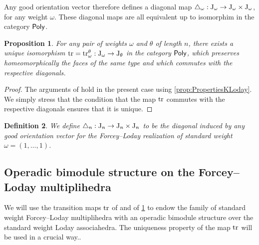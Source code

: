 \documentclass[twoside, 12pt]{amsart}
\newtheorem{definition}{Definition}[section]
\newtheorem{proposition}[definition]{Proposition}
\theoremstyle{remark}
\begin{document}
Any good orientation vector therefore defines a diagonal map $\triangle_\omega : \mathrm{J}_\omega\to \mathrm{J}_\omega \times \mathrm{J}_\omega$, for any weight $\omega$.
These diagonal maps are all equivalent up to isomorphim in the category $\mathsf{Poly}$. 

\begin{proposition}
\label{prop:transitionmap}
For any pair of weights $\omega$ and $\theta$ of length $n$, there exists a unique isomorphism 
$\mathrm{tr}=\mathrm{tr}_\omega^\theta : \mathrm{J}_\omega \to \mathrm{J}_\theta$ in the category $\mathsf{Poly}$,  
which preserves homeomorphically the faces of the same type and which commutes with the respective diagonals.
\end{proposition}

\begin{proof}
The arguments of \cite[Sections~3.1-3.2]{MTTV19} hold in the present case using \cref{prop:PropertiesKLoday}. 
We simply stress that the condition that the map $\mathrm{tr}$ commutes with the respective diagonals ensures that it is unique.
\end{proof}

\begin{definition} \label{def:diagonal-multipl-forcey-loday}
We define $\triangle_n : \mathrm{J}_n \to \mathrm{J}_n\times \mathrm{J}_n$ to be the diagonal induced by any good orientation vector for the Forcey--Loday realization of standard weight $\omega=(1, \ldots, 1)$.
\end{definition}


\subsection{Operadic bimodule structure on the Forcey--Loday multiplihedra}

We will use the transition maps $\mathrm{tr}$ of \cite[Definition 12]{MTTV19} and of \cref{prop:transitionmap} to endow the family of standard weight Forcey--Loday multiplihedra with an operadic bimodule structure over the standard weight Loday associahedra. 
The uniqueness property of the map $\mathrm{tr}$ will be used in a crucial way.. 
\end{document}
